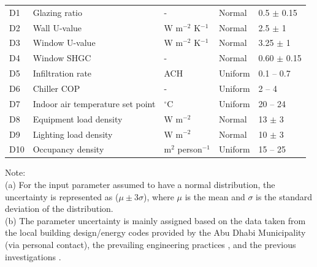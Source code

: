 \begin{table}[]
\begin{center}
{\begin{tabular}{lllll}
\hspace{6pt}D1  & Glazing ratio                                & -           & Normal       & 0.5 $\pm$ 0.15    \\
\hspace{6pt}D2  & Wall U-value                                 & W m$^{-2}$ K$^{-1}$   & Normal       & 2.5 $\pm$ 1       \\
\hspace{6pt}D3  & Window U-value                               & W m$^{-2}$ K$^{-1}$   & Normal       & 3.25 $\pm$ 1      \\
\hspace{6pt}D4  & Window SHGC                                  & -           & Normal       & 0.60 $\pm$ 0.15   \\
\hspace{6pt}D5  & Infiltration rate                            & ACH         & Uniform      & 0.1 -- 0.7     \\
\hspace{6pt}D6  & Chiller COP                                  & -           & Uniform      & 2 -- 4         \\
\hspace{6pt}D7  & Indoor air temperature set point             & $^{\circ}$C          & Uniform      & 20 -- 24       \\
\hspace{6pt}D8  & Equipment load density                       & W m$^{-2}$       & Normal       & 13 $\pm$ 3        \\
\hspace{6pt}D9  & Lighting load density                        & W m$^{-2}$       & Normal       & 10 $\pm$ 3        \\
\hspace{6pt}D10 & Occupancy density                            & m$^2$ person$^{-1}$ & Uniform      & 15 -- 25       \\
\bottomrule
\end{tabular}
}
\end{center}
Note: \\
(a) For the input parameter assumed to have a normal distribution, the uncertainty is represented as ($\mu \pm 3\sigma$), where $\mu$ is the mean and $\sigma$ is the standard deviation of the distribution. \\
(b) The parameter uncertainty is mainly assigned based on the data taken from the local building design/energy codes provided by the Abu Dhabi Municipality (via personal contact), the prevailing engineering practices \cite{martin2015estimation,deru2011us,radhi2009evaluating,afshari2014life}, and the previous investigations \cite{bueno2013urban,bueno2014computationally,bueno2013calculation}. \\

\end{table}
